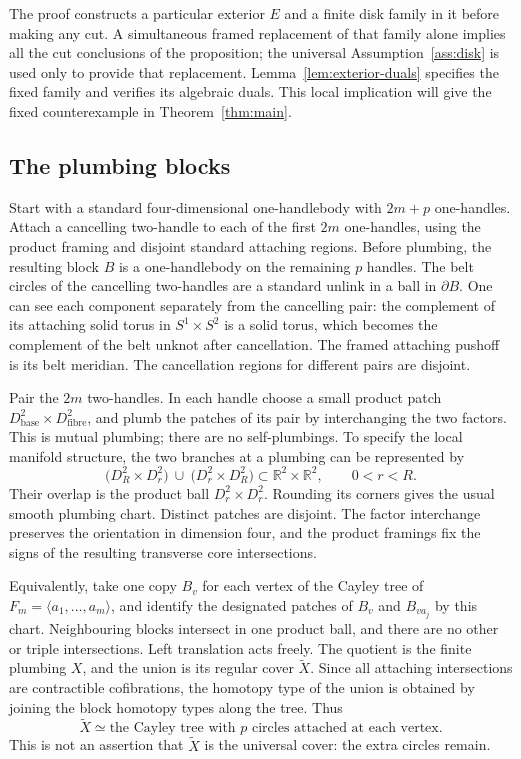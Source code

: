 The proof constructs a particular exterior \(E\) and a finite disk
family in it before making any cut. A simultaneous framed replacement
of that family alone implies all the cut conclusions of the proposition;
the universal Assumption~\ref{ass:disk} is used only to provide that
replacement. Lemma~\ref{lem:exterior-duals} specifies the fixed family
and verifies its algebraic duals. This local implication will give the
fixed counterexample in Theorem~\ref{thm:main}.

\subsection{The plumbing blocks}
\label{subsec:plumbing-blocks}

Start with a standard four-dimensional one-handlebody with \(2m+p\)
one-handles. Attach a cancelling two-handle to each of the first \(2m\)
one-handles, using the product framing and disjoint standard attaching
regions. Before plumbing, the resulting block \(B\) is a one-handlebody
on the remaining \(p\) handles. The belt circles of the cancelling
two-handles are a standard unlink in a ball in \(\partial B\).
One can see each component separately from the cancelling pair:
the complement of its attaching solid torus in \(S^1\times S^2\) is a
solid torus, which becomes the complement of the belt unknot after
cancellation. The framed attaching pushoff is its belt meridian.
The cancellation regions for different pairs are disjoint.

Pair the \(2m\) two-handles. In each handle choose a small product patch
\(D^2_{\mathrm{base}}\times D^2_{\mathrm{fibre}}\), and plumb the patches
of its pair by interchanging the two factors. This is mutual plumbing;
there are no self-plumbings. To specify the local manifold structure,
the two branches at a plumbing can be represented by
\[
 \bigl(D^2_R\times D^2_r\bigr)
 \ \cup\
 \bigl(D^2_r\times D^2_R\bigr)
 \subset\mathbb R^2\times\mathbb R^2,\qquad 0<r<R.
\]
Their overlap is the product ball \(D^2_r\times D^2_r\). Rounding its
corners gives the usual smooth plumbing chart. Distinct patches are
disjoint. The factor interchange preserves the orientation in dimension
four, and the product framings fix the signs of the resulting transverse
core intersections.

Equivalently, take one copy \(B_v\) for each vertex of the Cayley tree of
\(F_m=\langle a_1,\ldots,a_m\rangle\), and identify the designated patches
of \(B_v\) and \(B_{va_j}\) by this chart. Neighbouring blocks intersect in
one product ball, and there are no other or triple intersections.
Left translation acts freely. The quotient is the finite plumbing \(X\),
and the union is its regular cover \(\widetilde X\).
Since all attaching intersections are contractible cofibrations, the
homotopy type of the union is obtained by joining the block homotopy
types along the tree. Thus
\begin{equation}
\label{eq:plumbing-homotopy}
 \widetilde X\simeq
 \text{the Cayley tree with \(p\) circles attached at each vertex}.
\end{equation}
This is not an assertion that \(\widetilde X\) is the universal cover:
the extra circles remain.

